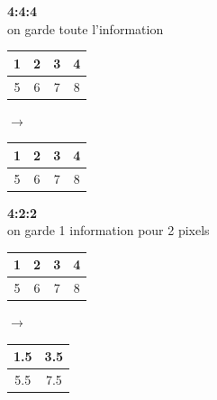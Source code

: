 \documentclass{article}
\begin{document}
\vspace{0.6cm}

\begin{minipage}[t]{0.45\textwidth}
    \centering
  \textbf{4:4:4} \ 
  \\ on garde toute l'information

\end{minipage}
\hfill
\begin{minipage}[t]{0.5\textwidth}
  \begin{tabular}{|c|c|c|c|}
    \hline
    1 & 2 & 3 & 4 \\
    \hline
    5 & 6 & 7 & 8 \\
    \hline
  \end{tabular}
    $ \rightarrow $
  \begin{tabular}{|c|c|c|c|}
    \hline
    1 & 2 & 3 & 4 \\
    \hline
    5 & 6 & 7 & 8 \\
    \hline
  \end{tabular}
\end{minipage}

\vspace{.6cm} %


\begin{minipage}[t]{0.45\textwidth}
    \centering
    \textbf{4:2:2}
    \\ on garde 1 information pour 2 pixels
\end{minipage}
\hfill
\begin{minipage}[t]{0.5\textwidth}
  \begin{tabular}{|c|c|c|c|}
    \hline
    1 & 2 & 3 & 4 \\
    \hline
    5 & 6 & 7 & 8 \\
    \hline
  \end{tabular}
    $ \rightarrow $
  \begin{tabular}{|c|c|}
    \hline
    1.5 & 3.5 \\
    \hline
    5.5 & 7.5 \\
    \hline
  \end{tabular}
\end{minipage}

\vspace{.6cm} 
\end{document}
